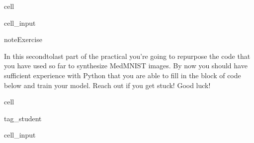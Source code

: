 \documentclass[letterpaper,10pt,english]{jupyterBook}
\begin{document}
\begin{sphinxuseclass}{cell}
\begin{sphinxVerbatimInput}
\begin{sphinxuseclass}{cell_input}
\begin{sphinxVerbatim}[commandchars=\\\{\}]
   
   
    
\end{sphinxVerbatim}

\end{sphinxuseclass}\end{sphinxVerbatimInput}

\end{sphinxuseclass}
\begin{sphinxadmonition}{note}{Exercise}

\sphinxAtStartPar
In this second\sphinxhyphen{}to\sphinxhyphen{}last part of the practical you’re going to repurpose the code that you have used so far to synthesize MedMNIST images. By now you should have sufficient experience with Python that you are able to fill in the block of code below and train your model. Reach out if you get stuck! Good luck!
\end{sphinxadmonition}

\begin{sphinxuseclass}{cell}
\begin{sphinxuseclass}{tag_student}\begin{sphinxVerbatimInput}

\begin{sphinxuseclass}{cell_input}
\begin{sphinxVerbatim}[commandchars=\\\{\}]
\end{sphinxVerbatim}

\end{sphinxuseclass}\end{sphinxVerbatimInput}

\end{sphinxuseclass}
\end{sphinxuseclass}
\end{document}
